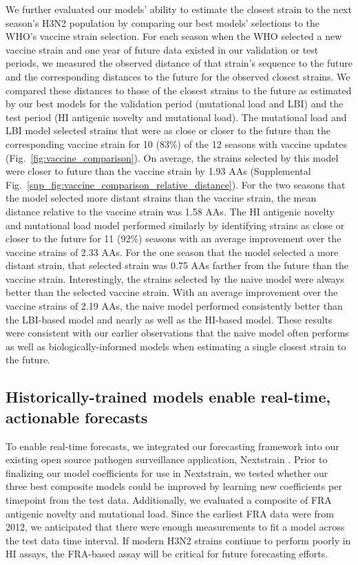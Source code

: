 We further evaluated our models' ability to estimate the closest strain to the next season's H3N2 population by comparing our best models' selections to the WHO's vaccine strain selection.
For each season when the WHO selected a new vaccine strain and one year of future data existed in our validation or test periods, we measured the observed distance of that strain's sequence to the future and the corresponding distances to the future for the observed closest strains.
We compared these distances to those of the closest strains to the future as estimated by our best models for the validation period (mutational load and LBI) and the test period (HI antigenic novelty and mutational load).
The mutational load and LBI model selected strains that were as close or closer to the future than the corresponding vaccine strain for 10 (83\%) of the 12 seasons with vaccine updates (Fig.~\ref{fig:vaccine_comparison}).
On average, the strains selected by this model were closer to future than the vaccine strain by 1.93 AAs (Supplemental Fig.~\ref{sup_fig:vaccine_comparison_relative_distance}).
For the two seasons that the model selected more distant strains than the vaccine strain, the mean distance relative to the vaccine strain was 1.58 AAs.
The HI antigenic novelty and mutational load model performed similarly by identifying strains as close or closer to the future for 11 (92\%) seasons with an average improvement over the vaccine strains of 2.33 AAs.
For the one season that the model selected a more distant strain, that selected strain was 0.75 AAs farther from the future than the vaccine strain.
Interestingly, the strains selected by the naive model were always better than the selected vaccine strain.
With an average improvement over the vaccine strains of 2.19 AAs, the naive model performed consistently better than the LBI-based model and nearly as well as the HI-based model.
These results were consistent with our earlier observations that the naive model often performs as well as biologically-informed models when estimating a single closest strain to the future.

\subsection*{Historically-trained models enable real-time, actionable forecasts}

To enable real-time forecasts, we integrated our forecasting framework into our existing open source pathogen surveillance application, Nextstrain \cite{Hadfield2018}.
Prior to finalizing our model coefficients for use in Nextstrain, we tested whether our three best composite models could be improved by learning new coefficients per timepoint from the test data.
Additionally, we evaluated a composite of FRA antigenic novelty and mutational load.
Since the earliest FRA data were from 2012, we anticipated that there were enough measurements to fit a model across the test data time interval.
If modern H3N2 strains continue to perform poorly in HI assays, the FRA-based assay will be critical for future forecasting efforts.

